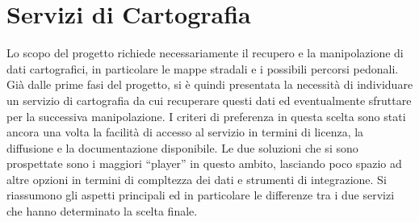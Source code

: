 \section{Servizi di Cartografia}
Lo scopo del progetto richiede necessariamente il recupero e la manipolazione di dati cartografici, in particolare le mappe stradali e i possibili percorsi pedonali. Già dalle prime fasi del progetto, si è quindi presentata la necessità di individuare un servizio di cartografia da cui recuperare questi dati ed eventualmente sfruttare per la successiva manipolazione. I criteri di preferenza in questa scelta sono stati ancora una volta la facilità di accesso al servizio in termini di licenza, la diffusione e la documentazione disponibile.
Le due soluzioni che si sono prospettate sono i maggiori ``player'' in questo ambito, lasciando poco spazio ad altre opzioni in termini di compltezza dei dati e strumenti di integrazione. Si riassumono gli aspetti principali ed in particolare le differenze tra i due servizi che hanno determinato la scelta finale.

